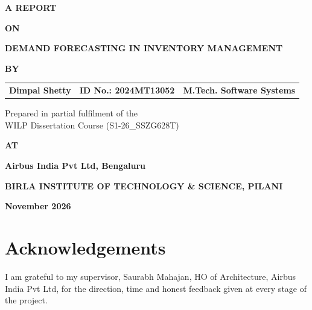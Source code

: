 \documentclass[12pt,oneside]{report}
\newcommand{\ReportTitle}{DEMAND FORECASTING IN INVENTORY MANAGEMENT}
\newcommand{\StudentName}{Dimpal Shetty}
\newcommand{\StudentID}{2024MT13052}
\newcommand{\Discipline}{M.Tech. Software Systems}
\newcommand{\CourseNo}{S1-26\_SSZG628T}
\newcommand{\OrgName}{Airbus India Pvt Ltd}
\newcommand{\OrgPlace}{Bengaluru}
\newcommand{\SubmitMonth}{November 2026}
\begin{document}
\setcounter{page}{1}
\begin{titlepage}
\thispagestyle{plain}
\centering\singlespacing
\vspace*{0.8in}
{\large\bfseries A REPORT\par}\vspace{0.6em}
{\large\bfseries ON\par}\vspace{0.6em}
{\Large\bfseries \ReportTitle\par}
\vspace{1.2in}
{\large\bfseries BY\par}\vspace{1.2em}
\begin{tabular*}{\textwidth}{@{\extracolsep{\fill}}lll}
\textbf{\StudentName} & \textbf{ID No.: \StudentID} & \textbf{\Discipline}
\end{tabular*}
\vspace{0.9in}

Prepared in partial fulfilment of the\\
WILP Dissertation Course (\CourseNo)
\vspace{0.9in}

{\large\bfseries AT\par}\vspace{1em}
{\bfseries \OrgName, \OrgPlace\par}
\vfill
{\bfseries BIRLA INSTITUTE OF TECHNOLOGY \& SCIENCE, PILANI\par}\vspace{0.4em}
{\bfseries \SubmitMonth\par}
\end{titlepage}
\setcounter{page}{2}

\doublespacing
\chapter*{Acknowledgements}

I am grateful to my supervisor, Saurabh Mahajan, HO of Architecture, \OrgName, for the direction, time and honest feedback given at every stage of the project.
\end{document}
